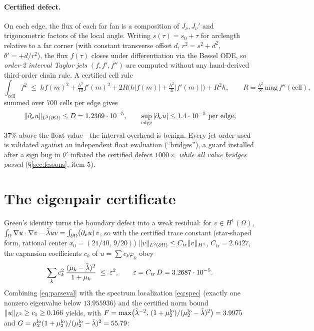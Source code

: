 \documentclass[11pt]{article}
\begin{document}
\paragraph{Certified defect.}
On each edge, the flux of each far fan is a composition of
$J_\nu,J_\nu'$ and trigonometric factors of the local angle. Writing
$s(\tau)=s_0+\tau$ for arclength relative to a far corner (with
constant transverse offset $d$, $r^2=s^2+d^2$, $\theta'=+d/r^2$), the
flux $f(\tau)$ closes under differentiation via the Bessel ODE, so
\emph{order-2 interval Taylor jets} $(f,f',f'')$ are computed without
any hand-derived third-order chain rule. A certified cell rule
\[
\textstyle\int_{\text{cell}} f^2
\;\le\; h f(m)^2 + \tfrac{h^3}{12}f'(m)^2
+ 2R\bigl(h|f(m)|+\tfrac{h^2}{4}|f'(m)|\bigr) + R^2 h,
\qquad R=\tfrac{h^2}{8}\,\mathrm{mag}\,f''(\text{cell}),
\]
summed over $700$ cells per edge gives
\begin{equation}\label{eq:defect}
\lVert \partial_\nu u \rVert_{L^2(\partial\Omega)} \le D = 1.2369\cdot10^{-5},
\qquad \sup_{\text{edge}}|\partial_\nu u| \le 1.4\cdot10^{-5}\ \text{per edge},
\end{equation}
$37\%$ above the float value---the interval overhead is benign. Every
jet order used is validated against an independent float evaluation
(``bridges''), a guard installed after a sign bug in $\theta'$ inflated
the certified defect $1000\times$ \emph{while all value bridges passed}
(\S\ref{sec:lessons}, item 5).

\section{The eigenpair certificate}\label{sec:eigenpair}

Green's identity turns the boundary defect into a weak residual: for
$v\in H^1(\Omega)$,
$\int_\Omega \nabla u\cdot\nabla v - \tilde\lambda u v = \int_{\partial\Omega}(\partial_\nu u)\,v$,
so with the certified trace constant (star-shaped form, rational center
$x_0=(21/40,\,9/20)$)
$\lVert v \rVert_{L^2(\partial\Omega)}\le C_{\mathrm{tr}}\lVert v \rVert_{H^1}$,
$C_{\mathrm{tr}}=2.6427$, the expansion coefficients $c_k$ of
$u=\sum c_k\varphi_k$ obey
\begin{equation}\label{eq:parseval}
\sum_k c_k^2\,\frac{(\mu_k-\tilde\lambda)^2}{1+\mu_k} \;\le\; \varepsilon^2,
\qquad \varepsilon = C_{\mathrm{tr}}\,D = 3.2687\cdot10^{-5}.
\end{equation}
Combining \eqref{eq:parseval} with the spectrum localization
\eqref{eq:spec} (exactly one nonzero eigenvalue below $13.955936$) and
the certified norm bound $\lVert u \rVert_{L^2}\ge c_1 \ge 0.166$ yields, with
$F=\max\bigl(\tilde\lambda^{-2},\,(1+\mu_2^{\mathrm{lo}})/(\mu_2^{\mathrm{lo}}-\tilde\lambda)^2\bigr)=3.9975$
and $G=\mu_2^{\mathrm{lo}}(1+\mu_2^{\mathrm{lo}})/(\mu_2^{\mathrm{lo}}-\tilde\lambda)^2=55.79$:
\end{document}
